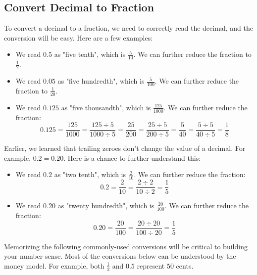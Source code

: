 \subsection{Convert Decimal to Fraction}
To convert a decimal to a fraction, we need to correctly read the decimal, and the conversion will be easy. Here are a few examples:

\begin{itemize}
\item We read $0.5$ as "five tenth", which is $\frac{5}{10}$. We can further reduce the fraction to $\frac{1}{2}$.
\item We read $0.05$ as "five hundredth", which is $\frac{5}{100}$. We can further reduce the fraction to $\frac{1}{20}$.
\item We read $0.125$ as "five thousandth", which is $\frac{125}{1000}$. We can further reduce the fraction:
\[ 0.125=\frac{125}{1000}=\frac{125\div5}{1000\div5}=\frac{25}{200}=\frac{25\div5}{200\div5}=\frac{5}{40}=\frac{5\div5}{40\div5}=\frac{1}{8} \]
\end{itemize}

Earlier, we learned that trailing zeroes don't change the value of a decimal. For example, $0.2=0.20$. Here is a chance to further understand this:
\begin{itemize}
\item We read $0.2$ as "two tenth", which is $\frac{2}{10}$. We can further reduce the fraction:
\[ 0.2=\frac{2}{10}=\frac{2\div2}{10\div2}=\frac{1}{5} \]
\item We read $0.20$ as "twenty hundredth", which is $\frac{20}{100}$. We can further reduce the fraction:
\[ 0.20=\frac{20}{100}=\frac{20\div20}{100\div20}=\frac{1}{5} \]
\end{itemize}

Memorizing the following commonly-used conversions will be critical to building your number sense. Most of the conversions below can be understood by the money model. For example, both $\frac{1}{2}$ and $0.5$ represent $50$ cents.

